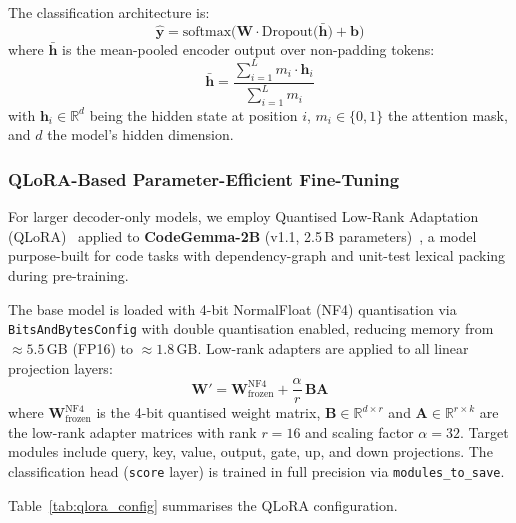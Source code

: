 \documentclass[conference]{IEEEtran}
\begin{document}
The classification architecture is:
\begin{equation}
    \hat{\mathbf{y}} = \text{softmax}\!\Big(
        \mathbf{W} \cdot \text{Dropout}\!\big(
            \bar{\mathbf{h}}
        \big) + \mathbf{b}
    \Big)
\label{eq:classifier}
\end{equation}
where $\bar{\mathbf{h}}$ is the mean-pooled encoder output over non-padding
tokens:
\begin{equation}
    \bar{\mathbf{h}} = \frac{
        \sum_{i=1}^{L} m_i \cdot \mathbf{h}_i
    }{
        \sum_{i=1}^{L} m_i
    }
\label{eq:mean_pool}
\end{equation}
with $\mathbf{h}_i \in \mathbb{R}^{d}$ being the hidden state at position
$i$, $m_i \in \{0,1\}$ the attention mask, and $d$ the model's hidden
dimension.

\subsubsection{QLoRA-Based Parameter-Efficient Fine-Tuning}
For larger decoder-only models, we employ Quantised Low-Rank Adaptation
(QLoRA)~\cite{dettmers2023qlora} applied to \textbf{CodeGemma-2B}
(v1.1, 2.5\,B parameters)~\cite{team2024codegemma}, a model
purpose-built for code tasks with dependency-graph and unit-test
lexical packing during pre-training.

The base model is loaded with 4-bit NormalFloat (NF4) quantisation via
\texttt{BitsAndBytesConfig} with double quantisation enabled, reducing
memory from $\approx\!5.5$\,GB (FP16) to $\approx\!1.8$\,GB.  Low-rank
adapters are applied to all linear projection layers:
\begin{equation}
    \mathbf{W}' = \mathbf{W}_{\text{frozen}}^{\text{NF4}}
                 + \frac{\alpha}{r}\,\mathbf{B}\mathbf{A}
\label{eq:lora}
\end{equation}
where $\mathbf{W}_{\text{frozen}}^{\text{NF4}}$ is the 4-bit quantised
weight matrix, $\mathbf{B} \in \mathbb{R}^{d \times r}$ and
$\mathbf{A} \in \mathbb{R}^{r \times k}$ are the low-rank adapter
matrices with rank $r = 16$ and scaling factor $\alpha = 32$.  Target
modules include query, key, value, output, gate, up, and down projections.
The classification head (\texttt{score} layer) is trained in full
precision via \texttt{modules\_to\_save}.

Table~\ref{tab:qlora_config} summarises the QLoRA configuration.
\end{document}
